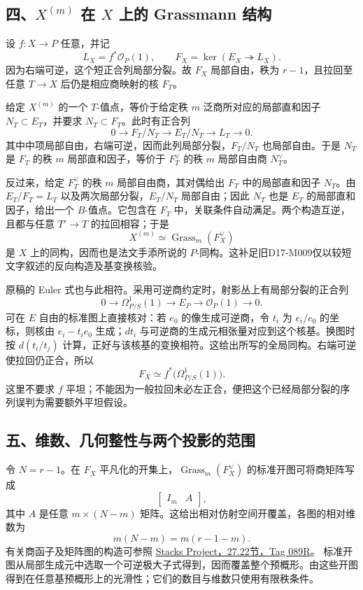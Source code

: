 \subsection*{四、$X^{(m)}$ 在 $X$ 上的 Grassmann 结构}

设 $f:X\to P$ 任意，并记
\[
L_X=f^*\mathcal O_P(1),\qquad
F_X=\ker(E_X\twoheadrightarrow L_X).
\]
因为右端可逆，这个短正合列局部分裂。故 $F_X$ 局部自由，秩为 $r-1$，且拉回至任意 $T\to X$ 后仍是相应商映射的核 $F_T$。

给定 $X^{(m)}$ 的一个 $T$-值点，等价于给定秩 $m$ 泛商所对应的局部直和因子 $N_T\subset E_T$，并要求 $N_T\subset F_T$。此时有正合列
\[
0\longrightarrow F_T/N_T\longrightarrow E_T/N_T
\longrightarrow L_T\longrightarrow0.
\]
其中中项局部自由，右端可逆，因而此列局部分裂，$F_T/N_T$ 也局部自由。于是 $N_T$ 是 $F_T$ 的秩 $m$ 局部直和因子，等价于 $F_T^\vee$ 的秩 $m$ 局部自由商 $N_T^\vee$。

反过来，给定 $F_T^\vee$ 的秩 $m$ 局部自由商，其对偶给出 $F_T$ 中的局部直和因子 $N_T$。由 $E_T/F_T=L_T$ 以及两次局部分裂，$E_T/N_T$ 局部自由；因此 $N_T$ 也是 $E_T$ 的局部直和因子，给出一个 $B$-值点。它包含在 $F_T$ 中，关联条件自动满足。两个构造互逆，且都与任意 $T'\to T$ 的拉回相容；于是
\[
X^{(m)}\simeq\operatorname{Grass}_m(F_X^\vee)
\]
是 $X$ 上的同构，因而也是法文手添所说的 $P$-同构。这补足旧D17-M009仅以较短文字叙述的反向构造及基变换核验。

原稿的 Euler 式也与此相符。采用可逆商约定时，射影丛上有局部分裂的正合列
\[
0\longrightarrow\Omega^1_{P/S}(1)\longrightarrow E_P
\longrightarrow\mathcal O_P(1)\longrightarrow0.
\]
可在 $E$ 自由的标准图上直接核对：若 $e_0$ 的像生成可逆商，令 $t_i$ 为 $e_i/e_0$ 的坐标，则核由 $e_i-t_i e_0$ 生成；$dt_i$ 与可逆商的生成元相张量对应到这个核基。换图时按 $d(t_i/t_j)$ 计算，正好与该核基的变换相符。这给出所写的全局同构。右端可逆使拉回仍正合，所以
\[
F_X\simeq f^*\bigl(\Omega^1_{P/S}(1)\bigr).
\]
这里不要求 $f$ 平坦；不能因为一般拉回未必左正合，便把这个已经局部分裂的序列误判为需要额外平坦假设。

\subsection*{五、维数、几何整性与两个投影的范围}

令 $N=r-1$。在 $F_X$ 平凡化的开集上，$\operatorname{Grass}_m(F_X^\vee)$ 的标准开图可将商矩阵写成
\[
\begin{bmatrix}I_m&A\end{bmatrix},
\]
其中 $A$ 是任意 $m\times(N-m)$ 矩阵。这给出相对仿射空间开覆盖，各图的相对维数为
\[
m(N-m)=m(r-1-m).
\]
有关商函子及矩阵图的构造可参照
\href{https://stacks.math.columbia.edu/tag/089R}{Stacks Project，27.22节，Tag 089R}。
标准开图从局部生成元中选取一个可逆极大子式得到，因而覆盖整个预概形。由这些开图得到在任意基预概形上的光滑性；它们的数目与维数只使用有限秩条件。

